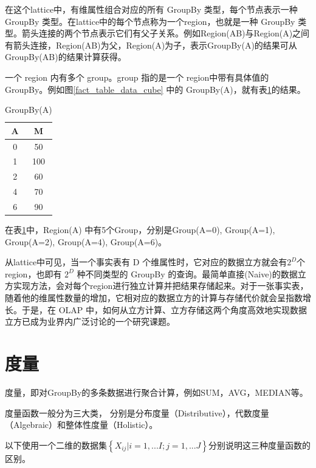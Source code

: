 在这个lattice中，有维属性组合对应的所有 GroupBy 类型，每个节点表示一种 GroupBy 类型。在lattice中的每个节点称为一个region，也就是一种 GroupBy 类型。箭头连接的两个节点表示它们有父子关系。例如Region(AB)与Region(A)之间有箭头连接，Region(AB)为父，Region(A)为子，表示GroupBy(A)的结果可从GroupBy(AB)的结果计算获得。

一个 region 内有多个 group。group 指的是一个
region中带有具体值的 GroupBy。例如图\ref{fact_table_data_cube} 中的 GroupBy(A)，就有表\ref{groupby_a_table}的结果。

\begin{table}[!ht]
\begin{center}
\begin{tabular}{|c|c|}
\hline 
A & M \\ 
\hline 
0 & 50 \\ 
\hline 
1 & 100 \\ 
\hline 
2 & 60 \\ 
\hline 
4 & 70 \\ 
\hline 
6 & 90 \\ 
\hline 
\end{tabular} 
\end{center}
\caption{GroupBy(A)}\label{groupby_a_table}
\end{table}

在表\ref{groupby_a_table}中，Region(A) 中有5个Group，分别是Group(A=0), Group(A=1), Group(A=2), Group(A=4), Group(A=6)。

从lattice中可见，当一个事实表有 D 个维属性时，它对应的数据立方就会有${2}^{D}$个region，也即有 ${2}^{D}$ 种不同类型的 GroupBy 的查询。最简单直接(Naive)的数据立方实现方法，会对每个region进行独立计算并把结果存储起来。对于一张事实表，随着他的维属性数量的增加，它相对应的数据立方的计算与存储代价就会呈指数增长。于是，在 OLAP 中，如何从立方计算、立方存储这两个角度高效地实现数据立方已成为业界内广泛讨论的一个研究课题。


\section{度量}

度量，即对GroupBy的多条数据进行聚合计算，例如SUM，AVG，MEDIAN等。

度量函数一般分为三大类， 分别是分布度量（Distributive），代数度量（Algebraic）和整体性度量（Holistic）。

以下使用一个二维的数据集$\left\{ {X}_{ij}|i=1,...I; j=1,...J \right\}$分别说明这三种度量函数的区别。

